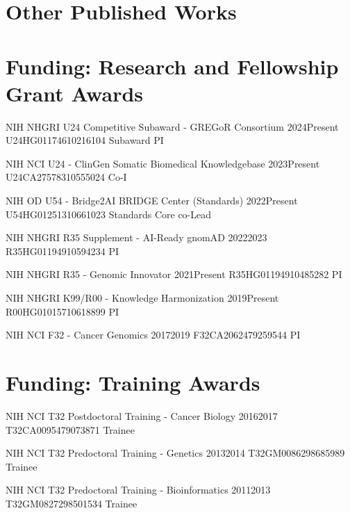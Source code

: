 \documentclass[10pt]{article} %
\begin{document}
\section{Other Published Works}

\begin{enumerate}



\end{enumerate}


\section{Funding: Research and Fellowship Grant Awards}

\nihFund
{NIH NHGRI U24 Competitive Subaward - GREGoR Consortium}
{2024}{Present}
{U24HG011746}{10216104}
{Subaward PI}

\nihFund
{NIH NCI U24 - ClinGen Somatic Biomedical Knowledgebase}
{2023}{Present}
{U24CA275783}{10555024}
{Co-I}

\nihFund
{NIH OD U54 - Bridge2AI BRIDGE Center (Standards)}
{2022}{Present}
{U54HG012513}{10661023}
{Standards Core co-Lead}

\nihFund
{NIH NHGRI R35 Supplement - AI-Ready gnomAD}
{2022}{2023}
{R35HG011949}{10594234}
{PI}

\nihFund
{NIH NHGRI R35 - Genomic Innovator}
{2021}{Present}
{R35HG011949}{10485282}
{PI}

\nihFund
{NIH NHGRI K99/R00 - Knowledge Harmonization}
{2019}{Present}
{R00HG010157}{10618899}
{PI}

\nihFund
{NIH NCI F32 - Cancer Genomics}
{2017}{2019}
{F32CA206247}{9259544}
{PI}

\section{Funding: Training Awards}

\nihFund
{NIH NCI T32 Postdoctoral Training - Cancer Biology}
{2016}{2017}
{T32CA009547}{9073871}
{Trainee}

\nihFund
{NIH NCI T32 Predoctoral Training - Genetics}
{2013}{2014}
{T32GM008629}{8685989}
{Trainee}

\nihFund
{NIH NCI T32 Predoctoral Training - Bioinformatics}
{2011}{2013}
{T32GM082729}{8501534}
{Trainee}
\end{document}
